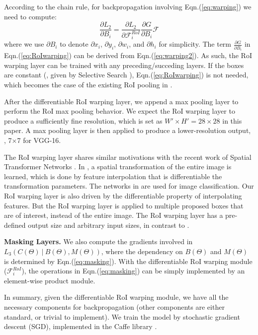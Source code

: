 \documentclass[10pt,twocolumn,letterpaper]{article}
\begin{document}
According to the chain rule, for backpropagation involving Eqn.(\ref{eq:warping}) we need to compute:
\begin{equation}
\frac{\partial{L_2}}{\partial{B_i}} = \frac{\partial{L_2}}{\partial{\mathcal{F}^{RoI}_i}} \frac{\partial{G}}{\partial{B_i}}\mathcal{F}
\label{eq:RoIwarping}
\end{equation}
where we use ${\partial{B_i}}$ to denote ${\partial{x_i}}$, ${\partial{y_i}}$, ${\partial{w_i}}$, and ${\partial{h_i}}$ for simplicity. The term $\frac{\partial{G}}{\partial{B_i}}$ in Eqn.(\ref{eq:RoIwarping}) can be derived from Eqn.(\ref{eq:warping2}). As such, the RoI warping layer can be trained with any preceding/succeding layers. If the boxes are constant (\eg, given by Selective Search \cite{Uijlings2013}), Eqn.(\ref{eq:RoIwarping}) is not needed, which becomes the case of the existing RoI pooling in \cite{Girshick2015}.

After the differentiable RoI warping layer, we append a max pooling layer to perform the RoI max pooling behavior. We expect the RoI warping layer to produce a sufficiently fine resolution, which is set as $W'\times H'=28\times28$ in this paper. A max pooling layer is then applied to produce a lower-resolution output, \eg, 7$\times$7 for VGG-16.

The RoI warping layer shares similar motivations with the recent work of Spatial Transformer Networks \cite{Jaderberg2015}. In \cite{Jaderberg2015}, a spatial transformation of the entire image is learned, which is done by feature interpolation that is differentiable \wrt the transformation parameters. The networks in \cite{Jaderberg2015} are used for image classification. Our RoI warping layer is also driven by the differentiable property of interpolating features.
But the RoI warping layer is applied to multiple proposed boxes that are of interest, instead of the entire image. The RoI warping layer has a pre-defined output size and arbitrary input sizes, in contrast to \cite{Jaderberg2015}.


\vspace{.5em}
\noindent\textbf{Masking Layers.}
We also compute the gradients involved in $L_3(C(\Theta)~|~B(\Theta), M(\Theta))$, where the dependency on $B(\Theta)$ and $M(\Theta)$ is determined by Eqn.(\ref{eq:masking}).
With the differentiable RoI warping module ($\mathcal{F}^{RoI}_i$), the operations in Eqn.(\ref{eq:masking}) can be simply implemented by an element-wise product module.


\vspace{1em}
In summary, given the differentiable RoI warping module, we have all the necessary components for backpropagation (other components are either standard, or trivial to implement). We train the model by stochastic gradient descent (SGD), implemented in the Caffe library \cite{Jia2014}.
\end{document}
